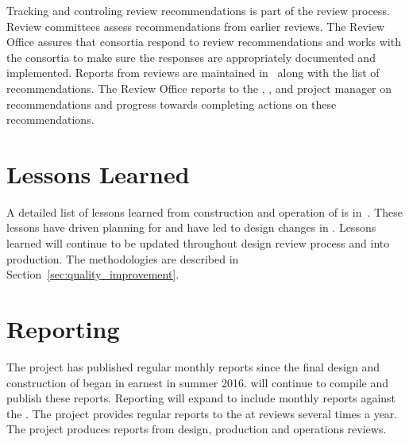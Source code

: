 Tracking and controling review recommendations is part of the review
process. Review committees assess recommendations from earlier
reviews. The Review Office assures that consortia respond to review
recommendations and works with the consortia to make sure the
responses are appropriately documented and implemented. Reports from
 reviews are maintained in~ along with the
list of recommendations. The Review Office reports to the ,
, and  project manager on recommendations
and progress towards completing actions on these recommendations.


\section{Lessons Learned}
\label{sec:fdsp-coord-lessons}

A detailed list of lessons learned from construction and operation of
 is in~. These lessons have driven planning for
 and have led to design changes in . Lessons
learned will continue to be updated throughout design review process
and into production. The methodologies are described in
Section~\ref{sec:quality_improvement}. %


\section{Reporting}
\label{sec:fdsp-coord-reporting}

The  project has published regular monthly reports since
the final design and construction of  began in
earnest in summer 2016.  will continue to compile and
publish these reports. Reporting will expand to include monthly
reports against the . The  project provides
regular reports to the  at reviews several times a
year. The  project produces reports from design,
production and operations reviews.
